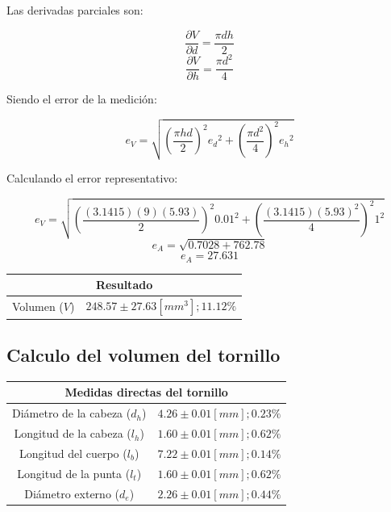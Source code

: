 \documentclass[letter,11pt]{article}
\begin{document}
Las derivadas parciales son:

\begin{equation}
    \frac{\partial{V}}{\partial{d}} = \frac{\pi d h}{2}
\end{equation}
\begin{equation}
    \frac{\partial{V}}{\partial{h}} = \frac{\pi d^2}{4}
\end{equation}

Siendo el error de la medición:

\begin{equation}
    e_V = \sqrt{
        \left(\frac{\pi h d}{2}\right)^2{e_d}^2+
        \left(\frac{\pi d^2}{4}\right)^2{e_h}^2
    }
\end{equation}

Calculando el error representativo:

\begin{equation*}
    e_V = \sqrt{
        \left(\frac{(3.1415)(9)(5.93)}{2}\right)^2{0.01}^2+
        \left(\frac{(3.1415)(5.93)^2}{4}\right)^2{1}^2
    }
\end{equation*}
\begin{equation*}
    e_A = \sqrt{0.7028+762.78}
\end{equation*}
\begin{equation*}
    e_A = 27.631
\end{equation*}

\begin{center}
\begin{tabular}{|c|>{\centering}m{5.0cm}<{\centering}|}
\hline
\multicolumn{2}{|c|}{\textbf{Resultado}}
\tabularnewline \hline
Volumen ($V$) & $248.57\pm27.63 [mm^3]; 11.12\%$ \tabularnewline \hline
\end{tabular}
\end{center}

\subsection{Calculo del volumen del tornillo}
\vspace*{0.25cm}
\begin{center}
\begin{tabular}{|c|>{\centering}m{5.0cm}<{\centering}|}
\hline
\multicolumn{2}{|c|}{\textbf{Medidas directas del tornillo}}
\tabularnewline \hline
Diámetro de la cabeza ($d_h$) & $4.26 \pm 0.01 [mm]; 0.23\%$
\tabularnewline \hline
Longitud de la cabeza ($l_h$) & $1.60 \pm 0.01 [mm]; 0.62\%$
\tabularnewline \hline
  Longitud del cuerpo ($l_b$) & $7.22 \pm 0.01 [mm]; 0.14\%$
\tabularnewline \hline
 Longitud de la punta ($l_t$) & $1.60 \pm 0.01 [mm]; 0.62\%$
\tabularnewline \hline
     Diámetro externo ($d_e$) & $2.26 \pm 0.01 [mm]; 0.44\%$
\tabularnewline \hline
\end{tabular}
\end{center}
\end{document}
